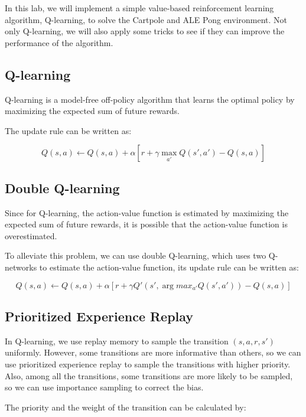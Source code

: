 In this lab, we will implement a simple value-based reinforcement learning algorithm, Q-learning, to solve the Cartpole and ALE Pong environment.
Not only Q-learning, we will also apply some tricks to see if they can improve the performance of the algorithm.

\subsection{Q-learning}

Q-learning is a model-free off-policy algorithm that learns the optimal policy by maximizing the expected sum of future rewards.

The update rule can be written as:

\begin{equation}
    Q(s, a) \leftarrow Q(s, a) + \alpha [r + \gamma \max_{a'} Q(s', a') - Q(s, a)]
\end{equation}

\subsection{Double Q-learning}

Since for Q-learning, the action-value function is estimated by maximizing the expected sum of future rewards, it is possible that the action-value function is overestimated.

To alleviate this problem, we can use double Q-learning, which uses two Q-networks to estimate the action-value function, its update rule can be written as:

\begin{equation}
    Q(s, a) \leftarrow Q(s, a) + \alpha [r + \gamma Q'(s', \arg max_{a'} Q(s', a')) - Q(s, a)]
\end{equation}

\subsection{Prioritized Experience Replay}

In Q-learning, we use replay memory to sample the transition $(s, a, r, s')$ uniformly. However, some transitions are more informative than others, so we can use prioritized experience replay to sample the transitions with higher priority.
Also, among all the transitions, some transitions are more likely to be sampled, so we can use importance sampling to correct the bias.

The priority and the weight of the transition can be calculated by:

